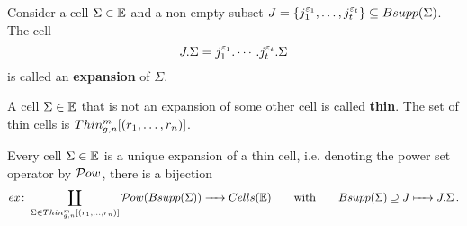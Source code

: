\begin{defi}
    \label{cellular_models:dual_ehrenfried:expansion_of_Sigma}
    Consider a cell $\Sigma \in \mathbb E$ and a non-empty subset $J = \{ j_1^{\eps_1}, \ldots, j_t^{\eps_t} \} \subseteq Bsupp(\Sigma)$.
    The cell
    \[
        J.\Sigma = j_1^{\varepsilon_1}. \cdots. j_t^{\varepsilon_t}.\Sigma
    \]
    is called an {\bfseries expansion} of $\Sigma$.
\end{defi}

\begin{defi}
    \label{cellular_models:dual_ehrenfried:thin_cells}
    A cell $\Sigma \in \mathbb E$ that is not an expansion of some other cell is called \textbf{thin}.
    The set of thin cells is $\Thin$.
\end{defi}

\begin{prop}
    \label{cellular_models:dual_ehrenfried:every_cell_is_an_expansion}
    Every cell $\Sigma \in \mathbb E$ is a unique expansion of a thin cell, i.e.
    denoting the power set operator by $\mathcal{P}ow$, there is a bijection
    \[
        ex \colon \coprod_{\Sigma \in \Thin} \mc Pow( Bsupp(\Sigma)) \to Cells(\E) \mspc{with}{20} Bsupp(\Sigma) \supseteq J \mapsto J.\Sigma \,.
    \]
\end{prop}

